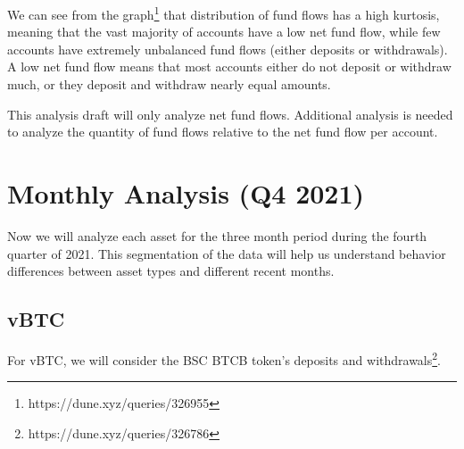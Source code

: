 \documentclass[12pt]{article}
\begin{document}
        We can see from the graph\footnote{https://dune.xyz/queries/326955} that distribution of fund flows has a high kurtosis, meaning that the vast majority of accounts have a low net fund flow, while few accounts have extremely unbalanced fund flows (either deposits or withdrawals). A low net fund flow means that most accounts either do not deposit or withdraw much, or they deposit and withdraw nearly equal amounts.

        This analysis draft will only analyze net fund flows. Additional analysis is needed to analyze the quantity of fund flows relative to the net fund flow per account.

    \section*{Monthly Analysis (Q4 2021)}
        Now we will analyze each asset for the three month period during the fourth quarter of 2021. This segmentation of the data will help us understand behavior differences between asset types and different recent months.
        \clearpage

        \subsection*{vBTC}
            For vBTC, we will consider the BSC BTCB token's deposits and withdrawals\footnote{https://dune.xyz/queries/326786}.
\end{document}
